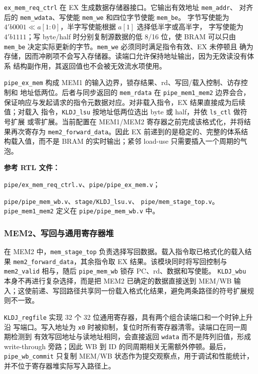 \documentclass[UTF8,zihao=-4,a4paper]{ctexart}
\numberwithin{table}{section}
\numberwithin{figure}{section}
\newcommand{\code}[1]{\texttt{#1}}
\begin{document}
\code{ex\_mem\_req\_ctrl} 在 EX 生成数据存储器接口。它输出有效地址 \code{mem\_addr}、
对齐后的 \code{mem\_wdata}、写使能 \code{mem\_we} 和四位字节使能 \code{mem\_be}。
字节写使能为 \(4'b0001\ll a[1:0]\)，半字写使能根据 \(a[1]\) 选择低半字或高半字，
字写使能为 \(4'b1111\)；写 byte/half 时分别复制源数据的低 8/16 位，使 BRAM 可以只由
\code{mem\_be} 决定实际更新的字节。\code{mem\_we} 必须同时满足指令有效、EX 未停顿且
确为存储，因而冲刷项不会写入存储器。读端口允许保持地址输出，因为无效读没有体系
结构副作用，其返回值也不会被无效流水项使用。

\code{pipe\_ex\_mem} 构成 MEM1 的输入边界，锁存结果、rd、写回/载入控制、访存控制和
地址低两位。后者与同步返回的 \code{mem\_rdata} 在 \code{pipe\_mem1\_mem2} 边界会合，
保证响应与发起请求的指令元数据对应。对非载入指令，EX 结果直接成为后续值；对载入
指令，\code{KLDJ\_lsu} 按地址低两位选出 byte 或 half，并依 \code{ls\_ctl} 做符号扩展
或零扩展。当前配置在 MEM1/MEM2 寄存器之前完成该格式化，并将结果再次寄存为
\code{mem2\_forward\_data}。因此 EX 前递到的是稳定的、完整的体系结构载入值，而不是
BRAM 的实时输出；紧邻 load-use 只需要插入一个周期的气泡。

\noindent\textbf{参考 RTL 文件：}\par
\noindent\code{pipe/ex\_mem\_req\_ctrl.v}、\code{pipe/pipe\_ex\_mem.v}；\par
\noindent\code{pipe/pipe\_mem\_wb.v}、\code{stage/KLDJ\_lsu.v}、
\code{pipe/mem\_stage\_top.v}。\code{pipe\_mem1\_mem2} 定义在
\code{pipe/pipe\_mem\_wb.v} 中。

\subsubsection{MEM2、写回与通用寄存器堆}

在 MEM2 中，\code{mem\_stage\_top} 负责选择写回数据。载入指令取已格式化的载入结果
\code{mem2\_forward\_data}，其余指令取 EX 结果。该模块同时将写回控制与
\code{mem2\_valid} 相与，随后 \code{pipe\_mem\_wb} 锁存 PC、rd、数据和写使能。
\code{KLDJ\_wbu} 本身不再进行复杂选择，而是把 MEM2 已确定的数据直接送到 MEM/WB
输入；这使前递、写回路径共享同一份载入格式化结果，避免两条路径的符号扩展规则不一致。

\code{KLDJ\_regfile} 实现 32 个 32 位通用寄存器，具有两个组合读端口和一个时钟上升沿
写端口。写入地址为 \code{x0} 时被抑制，复位时所有寄存器清零。读端口在同一周期检测到
有效写回地址与读地址相同，会直接返回 \code{wdata} 而不是阵列旧值，形成 write-through
旁路；因此 WB 到 ID 的同周期相关无需额外停顿。最后，\code{pipe\_wb\_commit} 只复制
MEM/WB 状态作为提交观察点，用于调试和性能统计，并不位于寄存器堆实际写入路径上。
\end{document}
